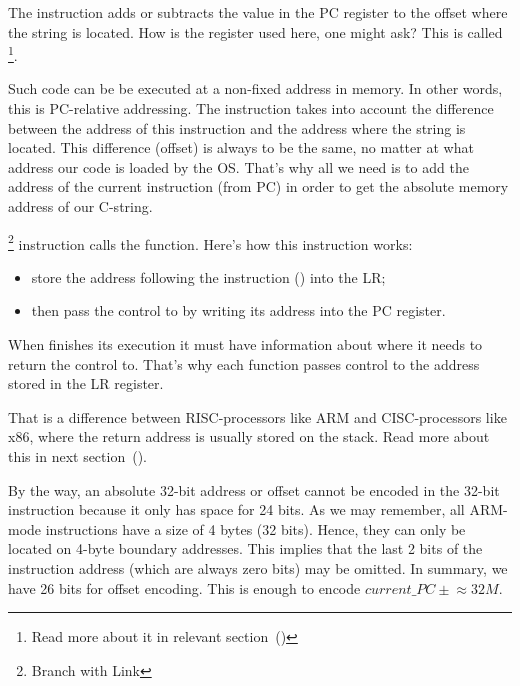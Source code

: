 \myindex{\PICcode}
The 
instruction adds or subtracts the value in the \ac{PC} register to the offset where the  string is located.
How is the  register used here, one might ask?
This is called \q{\PICcode}\footnote{Read more about it in relevant section~()}.

Such code can be be executed at a non-fixed address in memory.
In other words, this is \ac{PC}-relative addressing.
The  instruction takes into account the difference between the address of this instruction and the address where the string is located.
This difference (offset) is always to be the same, no matter at what address our code is loaded by the \ac{OS}.
That's why all we need is to add the address of the current instruction (from \ac{PC}) in order to get the absolute memory address of our C-string.

\footnote{Branch with Link} instruction calls the \printf function. 
Here's how this instruction works: 

\begin{itemize}
\item store the address following the  instruction () into the \ac{LR};
\item then pass the control to \printf by writing its address into the \ac{PC} register.
\end{itemize}

When \printf finishes its execution it must have information about where it needs to return the control to.
That's why each function passes control to the address stored in the \ac{LR} register.

That is a difference between  \ac{RISC}-processors like ARM and \ac{CISC}-processors like x86,
where the return address is usually stored on the stack.
Read more about this in next section~().

By the way, an absolute 32-bit address or offset cannot be encoded in the 32-bit  instruction because
it only has space for 24 bits.
As we may remember, all ARM-mode instructions have a size of 4 bytes (32 bits).
Hence, they can only be located on 4-byte boundary addresses.
This implies that the last 2 bits of the instruction address (which are always zero bits) may be omitted.
In summary, we have 26 bits for offset encoding. This is enough to encode $current\_PC \pm{} \approx{}32M$.

